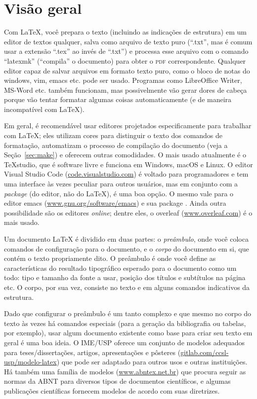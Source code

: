 \section{Visão geral}

\enlargethispage{.5\baselineskip}

Com \LaTeX{}, você prepara o texto (incluindo as indicações de estrutura) em
um editor de textos qualquer, salva como arquivo de texto puro (``.txt'',
mas é comum usar a extensão ``.tex'' ao invés de ``.txt'') e processa esse
arquivo com o comando ``latexmk'' (``compila'' o documento) para obter o
\textsc{pdf} correspondente. Qualquer editor capaz de salvar arquivos em formato
texto puro, como o bloco de notas do windows, vim, emacs etc. pode ser usado.
Programas como LibreOffice Writer, MS-Word etc. também funcionam, mas
possivelmente vão gerar dores de cabeça porque vão tentar formatar algumas
coisas automaticamente (e de maneira incompatível com \LaTeX{}).

Em geral, é recomendável usar editores projetados especificamente para
trabalhar com \LaTeX{}; eles utilizam cores para distinguir o texto dos
comandos de formatação, automatizam o processo de compilação do documento
(veja a Seção~\ref{sec:make})
e oferecem outras comodidades. O mais usado atualmente é o \TeX{}studio,
que é software livre e funciona em Windows, macOS e Linux. O editor Visual
Studio Code (\url{code.visualstudio.com}) é voltado para programadores e
tem uma interface às vezes peculiar para outros usuários, mas em conjunto
com a \emph{package}  (do editor, não do \LaTeX), é uma
boa opção. O mesmo vale para o editor emacs (\url{www.gnu.org/software/emacs})
e sua package . Ainda outra possibilidade são os editores
\emph{online}; dentre eles, o overleaf (\url{www.overleaf.com}) é o mais usado.

Um documento \LaTeX{} é dividido em duas partes: o \emph{preâmbulo}, onde
você coloca comandos de configuração para o documento, e o \emph{corpo}
do documento em si, que contém o texto propriamente dito. O preâmbulo é
onde você define as características do resultado tipográfico esperado
para o documento como um todo: tipo e tamanho da fonte a usar, posição
dos títulos e subtítulos na página etc. O corpo, por sua vez, consiste no
texto e em alguns comandos indicativos da estrutura.

Dado que configurar o preâmbulo é um tanto complexo e que mesmo no corpo
do texto às vezes há comandos especiais (para a geração da bibliografia
ou tabelas, por exemplo),
usar algum documento existente como base para criar seu texto em geral é
uma boa ideia. O IME/USP oferece um conjunto de modelos adequados para
teses/dissertações, artigos, apresentações e pôsteres (\url{gitlab.com/ccsl-usp/modelo-latex})
que pode ser adaptado para outros usos e outras instituições. Há também uma
família de modelos (\url{www.abntex.net.br}) que procura seguir as normas
da ABNT para diversos tipos de documentos científicos, e algumas publicações
científicas fornecem modelos de acordo com suas diretrizes.

